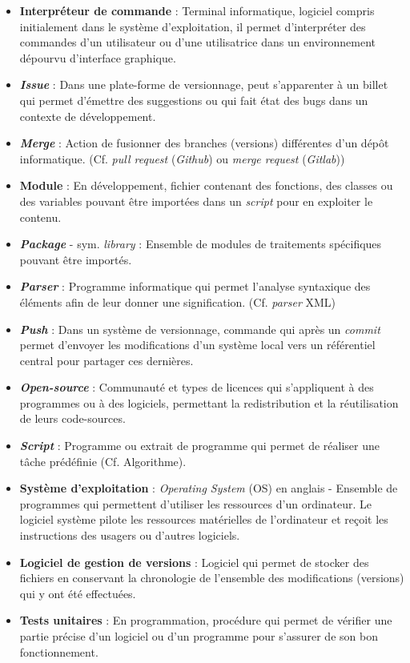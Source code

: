 \begin{itemize}
    \item \textbf{Interpréteur de commande} : Terminal informatique, logiciel compris initialement dans le système d'exploitation, il permet d'interpréter des commandes d'un utilisateur ou d'une utilisatrice dans un environnement dépourvu d'interface graphique.
    \item \textbf{\textit{Issue}} : Dans une plate-forme de versionnage, peut s'apparenter à un billet qui permet d'émettre des suggestions ou qui fait état des bugs dans un contexte de développement. 
    \item \textbf{\textit{Merge}} : Action de fusionner des branches (versions) différentes d'un dépôt informatique. (Cf. \textit{pull request} (\textit{Github}) ou \textit{merge request} (\textit{Gitlab}))
    \item \textbf{Module} : En développement, fichier contenant des fonctions, des classes ou des variables pouvant être importées dans un \textit{script} pour en exploiter le contenu.
    \item \textbf{\textit{Package}} - sym. \textit{library} : Ensemble de modules de traitements spécifiques pouvant être importés.
    \item \textbf{\textit{Parser}} :  Programme informatique qui permet l'analyse syntaxique des éléments afin de leur donner une signification. (Cf. \textit{parser} XML)
    \item \textbf{\textit{Push}} : Dans un système de versionnage, commande qui après un \textit{commit} permet d'envoyer les modifications d'un système local vers un référentiel central pour partager ces dernières.
    \item \textbf{\textit{Open-source}} : Communauté et types de licences qui s'appliquent à des programmes ou à des logiciels, permettant la redistribution et la réutilisation de leurs code-sources.  
    \item \textbf{\textit{Script}} : Programme ou extrait de programme qui permet de réaliser une tâche prédéfinie (Cf. Algorithme). 
    \item \textbf{Système d'exploitation} : \textit{Operating System} (OS) en anglais - Ensemble de programmes qui permettent d'utiliser les ressources d'un ordinateur. Le logiciel système pilote les ressources matérielles de l'ordinateur et reçoit les instructions des usagers ou d'autres logiciels.
    \item \textbf{Logiciel de gestion de versions} : Logiciel qui permet de stocker des fichiers en conservant la chronologie de l'ensemble des modifications (versions) qui y ont été effectuées.
    \item \textbf{Tests unitaires} : En programmation, procédure qui permet de vérifier une partie précise d'un logiciel ou d'un programme pour s'assurer de son bon fonctionnement.
\end{itemize}